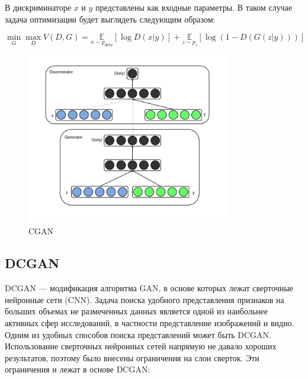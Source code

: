 \documentclass{article}
\theoremstyle{definition}
\theoremstyle{theorem}
\theoremstyle{remark}
\theoremstyle{theorem}
\theoremstyle{example}
\theoremstyle{theorem}
\theoremstyle{theorem}
\theoremstyle{theorem}
\theoremstyle{theorem}
\begin{document}
В дискриминаторе $x$ и $y$ представлены как входные параметры. В таком случае задача оптимизации будет выглядеть следующим образом:

$$\underset{G}{\min} \underset{D}{\max} V\left(D,G\right) = \underset{x\sim p_{data}}{ \mathbb{E}} \left[\log D(x|y)\right] + \underset{z\sim p_z}{ \mathbb{E}} \left[\log\left(1-D\left(G(z|y)\right)\right)\right]$$

\begin{figure}[!ht]
	\centering
	\includegraphics[width=0.8\textwidth]{img/cgan.png}
	\caption {CGAN}
	\label{fig:cgan}
\end{figure}

\newpage

\subsection{DCGAN}

DCGAN --- модификация алгоритма GAN, в основе которых лежат сверточные нейронные сети (CNN). Задача поиска удобного представления признаков на больших объемах не размеченных данных является одной из наибольнее активных сфер исследований, в частности представление изображений и видио. Одним из удобных способов поиска представлений может быть DCGAN. Использование сверточных нейронных сетей напрямую не давало хороших результатов, поэтому было внесены ограничения на слои сверток. Эти ограничения и лежат в основе DCGAN:
\end{document}
